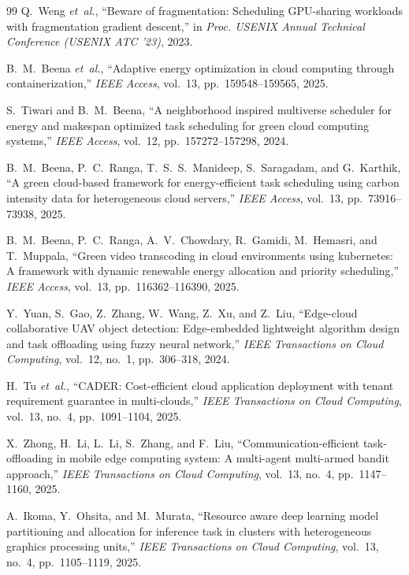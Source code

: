 \documentclass[12pt]{report}
\begin{document}
\begin{singlespace}
\begin{thebibliography}{99}
Q.~Weng \emph{et~al.}, ``Beware of fragmentation: Scheduling GPU-sharing workloads with fragmentation gradient descent,'' in \emph{Proc. USENIX Annual Technical Conference (USENIX ATC '23)}, 2023.

B.~M.~Beena \emph{et~al.}, ``Adaptive energy optimization in cloud computing through containerization,'' \emph{IEEE Access}, vol.~13, pp.~159548--159565, 2025.

S.~Tiwari and B.~M.~Beena, ``A neighborhood inspired multiverse scheduler for energy and makespan optimized task scheduling for green cloud computing systems,'' \emph{IEEE Access}, vol.~12, pp.~157272--157298, 2024.

B.~M.~Beena, P.~C.~Ranga, T.~S.~S.~Manideep, S.~Saragadam, and G.~Karthik, ``A green cloud-based framework for energy-efficient task scheduling using carbon intensity data for heterogeneous cloud servers,'' \emph{IEEE Access}, vol.~13, pp.~73916--73938, 2025.

B.~M.~Beena, P.~C.~Ranga, A.~V.~Chowdary, R.~Gamidi, M.~Hemasri, and T.~Muppala, ``Green video transcoding in cloud environments using kubernetes: A framework with dynamic renewable energy allocation and priority scheduling,'' \emph{IEEE Access}, vol.~13, pp.~116362--116390, 2025.

Y.~Yuan, S.~Gao, Z.~Zhang, W.~Wang, Z.~Xu, and Z.~Liu, ``Edge-cloud collaborative UAV object detection: Edge-embedded lightweight algorithm design and task offloading using fuzzy neural network,'' \emph{IEEE Transactions on Cloud Computing}, vol.~12, no.~1, pp.~306--318, 2024.

H.~Tu \emph{et~al.}, ``CADER: Cost-efficient cloud application deployment with tenant requirement guarantee in multi-clouds,'' \emph{IEEE Transactions on Cloud Computing}, vol.~13, no.~4, pp.~1091--1104, 2025.

X.~Zhong, H.~Li, L.~Li, S.~Zhang, and F.~Liu, ``Communication-efficient task-offloading in mobile edge computing system: A multi-agent multi-armed bandit approach,'' \emph{IEEE Transactions on Cloud Computing}, vol.~13, no.~4, pp.~1147--1160, 2025.

A.~Ikoma, Y.~Ohsita, and M.~Murata, ``Resource aware deep learning model partitioning and allocation for inference task in clusters with heterogeneous graphics processing units,'' \emph{IEEE Transactions on Cloud Computing}, vol.~13, no.~4, pp.~1105--1119, 2025.


\end{thebibliography}
\end{singlespace}
\end{document}
